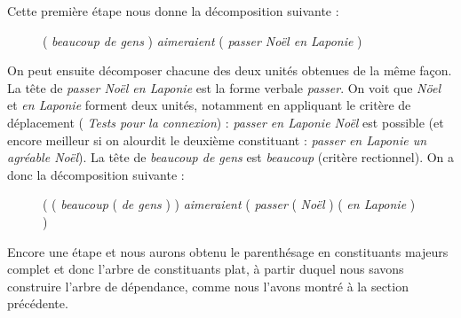Cette première étape nous donne la décomposition suivante :

\begin{figure}
   ( \textit{beaucoup de gens} ) \textit{aimeraient} ( \textit{passer Noël en Laponie} )
   \caption{\label{fig:}}
\end{figure}

On peut ensuite décomposer chacune des deux unités obtenues de la même façon. La tête de \textit{passer Noël en Laponie} est la forme verbale \textit{passer}. On voit que \textit{Nöel} et \textit{en Laponie} forment deux unités, notamment en appliquant le critère de déplacement ( \textit{Tests pour la connexion}) : \textit{passer en Laponie Noël} est possible (et encore meilleur si on alourdit le deuxième constituant : \textit{passer en Laponie un agréable Noël}). La tête de \textit{beaucoup de gens} est \textit{beaucoup} (critère rectionnel). On a donc la décomposition suivante :

\begin{figure}
      ( ( \textit{beaucoup}  ( \textit{de gens} ) )  \textit{aimeraient}  ( \textit{passer}  ( \textit{Noël} ) ( \textit{en Laponie} ) )
      \caption{\label{fig:}}
\end{figure}

Encore une étape et nous aurons obtenu le parenthésage en constituants majeurs complet et donc l’arbre de constituants plat, à partir duquel nous savons construire l’arbre de dépendance, comme nous l’avons montré à la section précédente.

